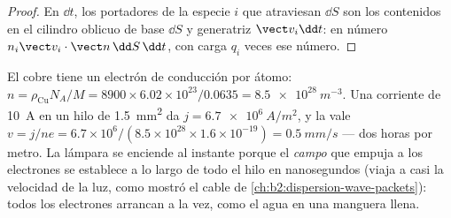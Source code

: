 \begin{proof}
En $\dd t$, los portadores de la especie $i$ que atraviesan $\dd S$ son los
contenidos en el cilindro oblicuo de base $\dd S$ y generatriz $\vect v_i\dd t$: en número
$n_i\vect v_i\cdot\vect n\,\dd S\,\dd t$, con carga $q_i$ veces ese número.
\end{proof}

\begin{example}\label{ex:b2:charges-currents-conduction:drift}
El cobre tiene un electrón de conducción por átomo: $n = \rho_{\text{Cu}}N_A/M =
8900 \times 6.02 \times 10^{23}/0.0635 = \qty{8.5e28}{m^{-3}}$. Una corriente de
\qty{10}{A} en un hilo de \qty{1.5}{mm^2} da $j = \qty{6.7e6}{A/m^2}$, y la
\emph{} vale $v = j/ne = 6.7 \times 10^6/(8.5 \times 10^{28} \times 1.6 \times
10^{-19}) = \qty{0.5}{mm/s}$ --- dos horas por metro. La lámpara se enciende
al instante porque el \emph{campo} que empuja a los electrones se
establece a lo largo de todo el hilo en nanosegundos (viaja a casi la
velocidad de la luz, como mostró el cable de
\cref{ch:b2:dispersion-wave-packets}): todos los electrones arrancan a la vez, como el agua en una manguera llena.
\end{example}

